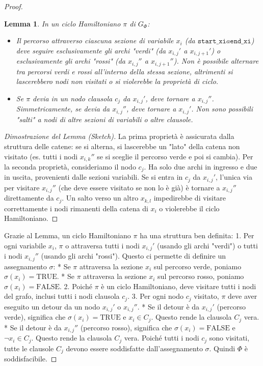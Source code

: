 \documentclass[a4paper, 11pt]{book} %
\newtheorem{lemma}[theorem]{Lemma}
\theoremstyle{definition}
\begin{document}
\begin{proof}
\begin{lemma}
In un ciclo Hamiltoniano $\pi$ di $G_\Phi$:
\begin{itemize}
    \item Il percorso attraverso ciascuna sezione di variabile $x_i$ (da $\texttt{start\_xi} a \texttt{end\_xi}$) deve seguire esclusivamente gli archi "verdi" (da $x_{i,j}'$ a $x_{i,j+1}'$) o esclusivamente gli archi "rossi" (da $x_{i,j}''$ a $x_{i,j+1}''$). Non è possibile alternare tra percorsi verdi e rossi all'interno della stessa sezione, altrimenti si lascerebbero nodi non visitati o si violerebbe la proprietà di ciclo.
    \item Se $\pi$ devia in un nodo clausola $c_j$ da $x_{i,j}'$, deve tornare a $x_{i,j}''$. Simmetricamente, se devia da $x_{i,j}''$, deve tornare a $x_{i,j}'$. Non sono possibili "salti" a nodi di altre sezioni di variabili o altre clausole.
\end{itemize}
\end{lemma}
\begin{proof}[Dimostrazione del Lemma (Sketch)]
La prima proprietà è assicurata dalla struttura delle catene: se si alterna, si lascerebbe un "lato" della catena non visitato (es. tutti i nodi $x_{i,k}''$ se si sceglie il percorso verde e poi si cambia). Per la seconda proprietà, consideriamo il nodo $c_j$. Ha solo due archi in ingresso e due in uscita, provenienti dalle sezioni variabili. Se si entra in $c_j$ da $x_{i,j}'$, l'unica via per visitare $x_{i,j}''$ (che deve essere visitato se non lo è già) è tornare a $x_{i,j}''$ direttamente da $c_j$. Un salto verso un altro $x_{k,l}$ impedirebbe di visitare correttamente i nodi rimanenti della catena di $x_i$ o violerebbe il ciclo Hamiltoniano.
\end{proof}

Grazie al Lemma, un ciclo Hamiltoniano $\pi$ ha una struttura ben definita:
1.  Per ogni variabile $x_i$, $\pi$ o attraversa tutti i nodi $x_{i,j}'$ (usando gli archi "verdi") o tutti i nodi $x_{i,j}''$ (usando gli archi "rossi"). Questo ci permette di definire un assegnamento $\sigma$:
    *   Se $\pi$ attraversa la sezione $x_i$ sul percorso verde, poniamo $\sigma(x_i) = \text{TRUE}$.
    *   Se $\pi$ attraversa la sezione $x_i$ sul percorso rosso, poniamo $\sigma(x_i) = \text{FALSE}$.
2.  Poiché $\pi$ è un ciclo Hamiltoniano, deve visitare tutti i nodi del grafo, inclusi tutti i nodi clausola $c_j$.
3.  Per ogni nodo $c_j$ visitato, $\pi$ deve aver eseguito un detour da un nodo $x_{i,j}'$ o $x_{i,j}''$.
    *   Se il detour è da $x_{i,j}'$ (percorso verde), significa che $\sigma(x_i)=\text{TRUE}$ e $x_i \in C_j$. Questo rende la clausola $C_j$ vera.
    *   Se il detour è da $x_{i,j}''$ (percorso rosso), significa che $\sigma(x_i)=\text{FALSE}$ e $\neg x_i \in C_j$. Questo rende la clausola $C_j$ vera.
Poiché tutti i nodi $c_j$ sono visitati, tutte le clausole $C_j$ devono essere soddisfatte dall'assegnamento $\sigma$.
Quindi $\Phi$ è soddisfacibile.
\end{proof}
\end{document}
